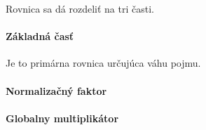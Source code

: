 Rovnica sa dá rozdeliť na tri časti. 


\paragraph{Základná časť} Je to primárna rovnica určujúca váhu pojmu.

\paragraph{Normalizačný faktor}

\paragraph{Globalny multiplikátor}

%
%
